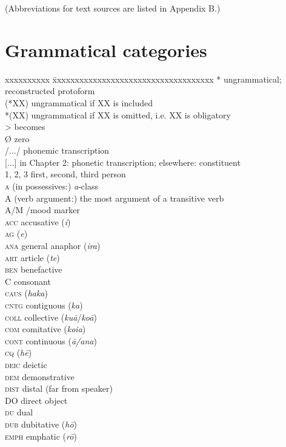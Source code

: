 

(Abbreviations for text sources are listed in Appendix B.)

\section*{Grammatical categories}

\begin{tabbing}
xxxxxxxxxx \= xxxxxxxxxxxxxxxxxxxxxxxxxxxxxxxxxxxx \kill
* \> ungrammatical; reconstructed protoform\\
(*XX) \> ungrammatical if XX is included\\
*(XX) \> ungrammatical if XX is omitted, i.e. XX is obligatory\\
{\textgreater} \> becomes\\
Ø \> zero\\
/.../ \> phonemic transcription\\
{[...]} \> in Chapter 2: phonetic transcription; elsewhere: constituent\\
1, 2, 3 \> first, second, third person\\
\textsc{a} \> (in possessives:) \textit{a}{}-class \\
A \> (verb argument:) the most  argument of a transitive verb\\
A/M \> /mood marker\\
{\scshape acc} \> accusative (\textit{i})\\
{\scshape ag} \>  (\textit{e})\\
{\scshape ana} \> general anaphor (\textit{ira})\\
{\scshape art} \> article (\textit{te})\\
{\scshape ben} \> benefactive\\
{\scshape C} \> consonant\\
{\scshape caus} \> { (\textit{haka})}\\
{\scshape cntg} \> contiguous (\textit{ka})\\
{\scshape coll} \> collective (\textit{kuā}/\textit{koā})\\
{\scshape com} \> {comitative (\textit{koia})}\\
{\scshape cont} \> continuous (\textit{{\ꞌ}ā/{\ꞌ}ana})\\
{\scshape cq} \>  (\textit{hē})\\
{\scshape deic} \> deictic\\
{\scshape dem} \> demonstrative\\
{\scshape dist} \> distal (far from speaker)\\
{\scshape DO} \> direct object\\
{\scshape du} \> dual\\
{\scshape dub} \> dubitative (\textit{hō})\\
{\scshape emph} \> emphatic (\textit{rō})\\


\end{tabbing}
